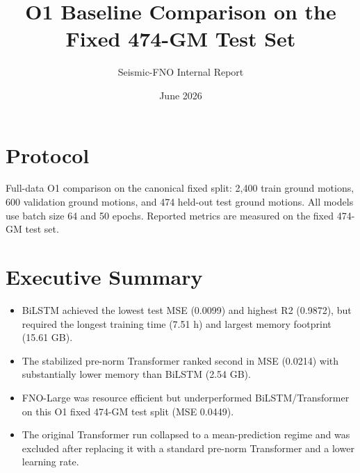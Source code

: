 \documentclass[10pt]{article}
\title{O1 Baseline Comparison on the Fixed 474-GM Test Set}
\author{Seismic-FNO Internal Report}
\date{June 2026}
\begin{document}
\maketitle
\section*{Protocol}
Full-data O1 comparison on the canonical fixed split: 2,400 train ground motions, 600 validation ground motions, and 474 held-out test ground motions. All models use batch size 64 and 50 epochs. Reported metrics are measured on the fixed 474-GM test set.
\section*{Executive Summary}
\begin{itemize}
  \item BiLSTM achieved the lowest test MSE (0.0099) and highest R2 (0.9872), but required the longest training time (7.51 h) and largest memory footprint (15.61 GB).
  \item The stabilized pre-norm Transformer ranked second in MSE (0.0214) with substantially lower memory than BiLSTM (2.54 GB).
  \item FNO-Large was resource efficient but underperformed BiLSTM/Transformer on this O1 fixed 474-GM test split (MSE 0.0449).
  \item The original Transformer run collapsed to a mean-prediction regime and was excluded after replacing it with a standard pre-norm Transformer and a lower learning rate.

\end{itemize}
\end{document}

